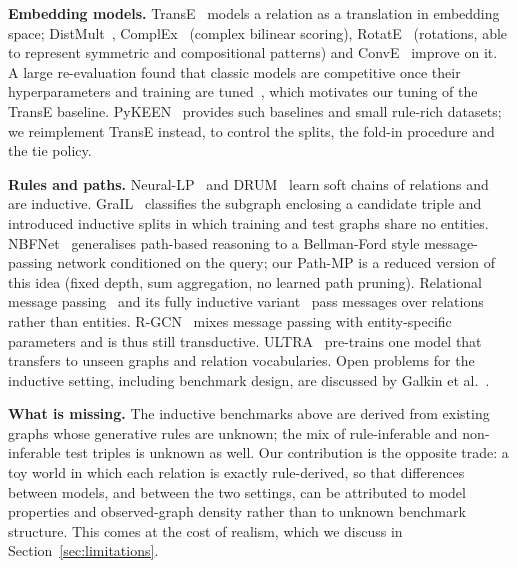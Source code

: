 \vspace{4pt}\noindent\textbf{Embedding models.} TransE~\cite{Bordes2013TranslatingEF} models a relation as a translation in embedding space; DistMult~\cite{yang2014embedding}, ComplEx~\cite{trouillon2016complex} (complex bilinear scoring), RotatE~\cite{sun2019rotate} (rotations, able to represent symmetric and compositional patterns) and ConvE~\cite{dettmers2017convolutional} improve on it. A large re-evaluation found that classic models are competitive once their hyperparameters and training are tuned~\cite{rossi2020knowledge}, which motivates our tuning of the TransE baseline. PyKEEN~\cite{ali2020pykeen} provides such baselines and small rule-rich datasets; we reimplement TransE instead, to control the splits, the fold-in procedure and the tie policy.

\vspace{4pt}\noindent\textbf{Rules and paths.} Neural-LP~\cite{yang2017differentiable} and DRUM~\cite{sadeghian2019drum} learn soft chains of relations and are inductive. GraIL~\cite{teru2019inductive} classifies the subgraph enclosing a candidate triple and introduced inductive splits in which training and test graphs share no entities. NBFNet~\cite{zhu2021neural} generalises path-based reasoning to a Bellman-Ford style message-passing network conditioned on the query; our Path-MP is a reduced version of this idea (fixed depth, sum aggregation, no learned path pruning). Relational message passing~\cite{wang2020relational} and its fully inductive variant~\cite{geng2022relational} pass messages over relations rather than entities. R-GCN~\cite{schlichtkrull2017modeling} mixes message passing with entity-specific parameters and is thus still transductive. ULTRA~\cite{galkin2023foundation} pre-trains one model that transfers to unseen graphs and relation vocabularies. Open problems for the inductive setting, including benchmark design, are discussed by Galkin et al.~\cite{galkin2022open}.

\vspace{4pt}\noindent\textbf{What is missing.} The inductive benchmarks above are derived from existing graphs whose generative rules are unknown; the mix of rule-inferable and non-inferable test triples is unknown as well. Our contribution is the opposite trade: a toy world in which each relation is exactly rule-derived, so that differences between models, and between the two settings, can be attributed to model properties and observed-graph density rather than to unknown benchmark structure. This comes at the cost of realism, which we discuss in Section~\ref{sec:limitations}.
